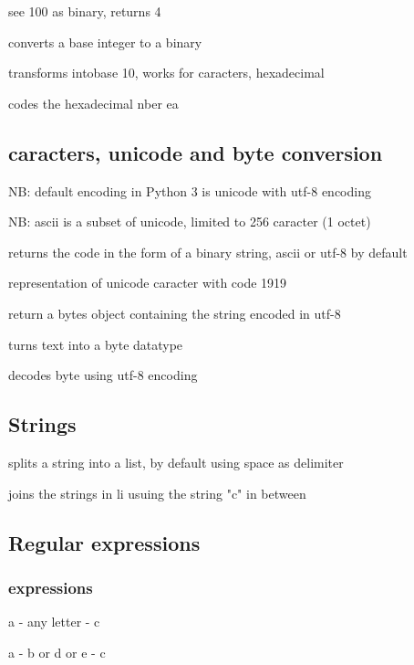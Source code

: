 		  see 100 as binary, returns 4

		 converts a base integer to a binary

		 transforms intobase 10, works for caracters, hexadecimal

		 codes the hexadecimal nber ea


	\subsection{caracters, unicode and byte conversion}

		NB: default encoding in Python 3 is unicode with utf-8 encoding

		NB: ascii is a subset of unicode, limited to 256 caracter (1 octet)

		 returns the code in the form of a binary string, ascii or utf-8 by default

		 representation of unicode caracter with code 1919

		 return a bytes object containing the string encoded in utf-8

		 turns text into a byte datatype

		 decodes byte using utf-8 encoding
	
	\subsection{Strings}

		 splits a string into a list, by default using space as delimiter

		 joins the strings in li usuing the string "c" in between


	\subsection{Regular expressions}

		\subsubsection{expressions}


			 a - any  letter  - c

			 a - b or d or e - c

